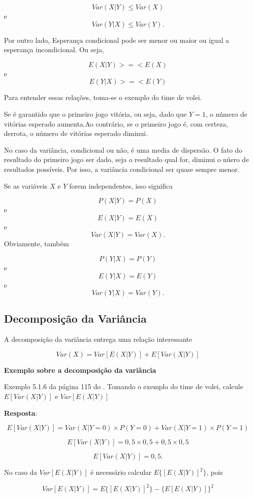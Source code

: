 \documentclass[
]{book}
\begin{document}
\[
  Var(X|Y) \leq Var(X)
\]
e
\[
  Var(Y|X) \leq Var(Y).
\]

Por outro lado, Esperança condicional pode ser menor ou maior ou igual a esperança incondicional. Ou seja,

\[
  E(X|Y) >=<E(X)
\]
e
\[
  E(Y|X) >=<E(Y)
\]

Para entender essas relações, toma-se o exemplo do time de volei.

Se é garantido que o primeiro jogo vitória, ou seja, dado que \(Y=1\), o número de vitórias esperado aumenta.Ao contrário, se o primeiro jogo é, com certeza, derrota, o número de vitórias esperado diminui.

No caso da variância, condicional ou não, é uma media de dispersão. O fato do resultado do primeiro jogo ser dado, seja o resultado qual for, diminui o núero de resultados possíveis. Por isso, a variância condicional ser quase sempre menor.

Se as variáveis \(X\) e \(Y\) forem independentes, isso significa

\[
  P(X|Y) = P(X)
\]
e
\[
  E(X|Y) = E(X)
\]
e
\[
  Var(X|Y) = Var(X).
\]
Obviamente, também

\[
  P(Y|X)= P(Y)
\]
e
\[
  E(Y|X) = E(Y)
\]
e
\[
  Var(Y|X) = Var(Y).
\]

\hypertarget{decomposiuxe7uxe3o-da-variuxe2ncia}{%
\subsection{Decomposição da Variância}\label{decomposiuxe7uxe3o-da-variuxe2ncia}}

A decomposição da variância entrega uma relação interessante

\[
  Var(X) = Var[E(X|Y)] + E[Var(X|Y)]
\]

\textbf{Exemplo sobre a decomposição da variância}

Exemplo 5.1.6 da página 115 do \citet{Sartoris2013}. Tomando o exemplo do time de volei, calcule \(E[Var(X|Y)]\) e \(Var[E(X|Y)]\)

\textbf{Resposta}:

\[
  E[Var(X|Y)] = Var(X|Y=0) \times P(Y=0) + Var(X|Y=1) \times P(Y=1)
\]

\[
  E[Var(X|Y)] = 0,5 \times 0,5 + 0,5 \times 0,5
\]

\[
  E[Var(X|Y)] = 0,5.
\]

No caso da \(Var[E(X|Y)]\) é necessário calcular \(E\{[E(X|Y)]^2\}\), pois

\[
  Var[E(X|Y)] = E\{[E(X|Y)]^2\} - \{E[E(X|Y)]\}^2
\]
\end{document}
